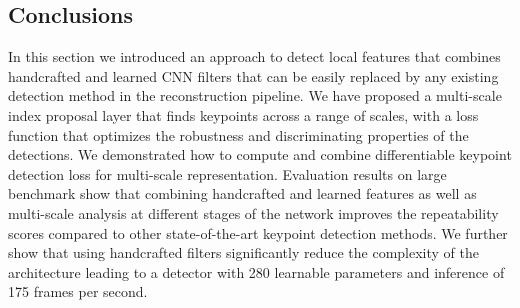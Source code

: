 \subsection{Conclusions}
In this section we introduced an approach to detect local features that combines handcrafted and learned CNN filters that can be easily replaced by any existing detection method in the reconstruction pipeline. We have proposed a multi-scale index proposal layer that finds keypoints across a range of scales, with a loss function that optimizes the robustness and discriminating properties of the detections. We demonstrated how to compute and combine differentiable keypoint detection loss for multi-scale representation. Evaluation results on large benchmark show that combining handcrafted and learned features as well as multi-scale analysis at different stages of the network improves the repeatability scores compared to other state-of-the-art keypoint detection methods. We further show that using handcrafted filters significantly reduce the complexity of the architecture leading to a detector with 280 learnable parameters and inference of 175 frames per second.